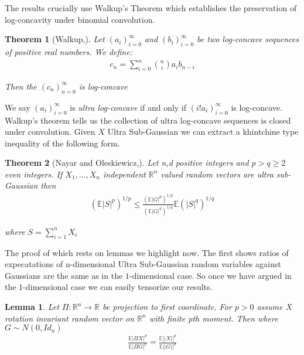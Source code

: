 \documentclass[10pt]{article}
\newcommand{\E}{\mathbb{E}}
\newcommand{\1}{\textbf{1}}
\newcommand{\R}{\mathbb{R}}
\newcommand{\normOne}[1]{\left\lvert#1\right\rvert}
\newtheorem{theorem}{Theorem}[subsection]
\newtheorem{lemma}{Lemma}[subsection]
\theoremstyle{remark}
\theoremstyle{definition}
\begin{document}
The results crucially use Walkup's Theorem which establishes the preservation of log-concavity under binomial convolution.

\begin{theorem}[Walkup,\cite{WW}]
	Let $(a_i)_{i=0}^{\infty}$ and $(b_i)_{i=0}^{\infty}$ be two log-concave sequences of positive real numbers. We define:
	\begin{align*}
		c_n = \sum_{i=0}^n {n \choose i} a_i b_{n-i}
	\end{align*}

	Then the $(c_n)_{n=0}^{\infty}$ is log-concave
\end{theorem}


We say $(a_i)_{i=0}^{\infty}$ is \textit{ultra log-concave} if and only if $(i! a_i)_{i=0}^{\infty}$ is log-concave. Walkup's theorem tells us the collection of ultra log-concave sequences is closed under convolution. Given $X$ Ultra Sub-Gaussian we can extract a khintchine type inequality of the following form.

\begin{theorem}[Nayar and Oleskiewicz,\cite{NO}]\label{thm:USG1}
	Let n,d positive integers and $p > q \geq 2$ even integers. If $X_1,...,X_n$ independent $\R^n$ valued random vectors are ultra sub-Gaussian then
	\begin{align*}
		(\E \normOne{S}^p)^{1/p} \leq \frac{(\E\normOne{G}^p)^{1/p}}{(\E\normOne{G}^q)^{1/q}}\E (\normOne{S}^q)^{1/q}
	\end{align*}

	where $S = \sum_{i=1}^n X_i$
\end{theorem} 

The proof of which rests on lemmas we highlight now. The first shows ratios of expecatations of n-dimensional Ultra Sub-Gaussian random variables against Gaussians are the same as in the $1$-dimensional case. So once we have argued in the $1$-dimensional case we can easily tensorize our results.

\begin{lemma}\label{lem:USG1}
	Let $\Pi: \R^n \to \R$ be projection to first coordinate. For $p > 0$ assume X rotation invariant random vector on $\R^n$ with finite pth moment. Then where $G \sim N(0,Id_n)$
	\begin{align*}
		\frac{\E|\Pi X|^p}{\E |\Pi G|^p} = \frac{\E||X||^p}{\E||G||^p}
	\end{align*}
\end{lemma}
\end{document}
